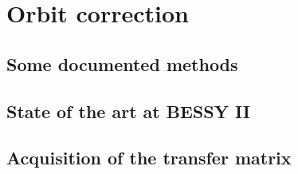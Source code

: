\chapter{Orbit correction}
\label{sec:correction}
\section{Some documented methods}
\section{State of the art at BESSY II}
\section{Acquisition of the transfer matrix}

